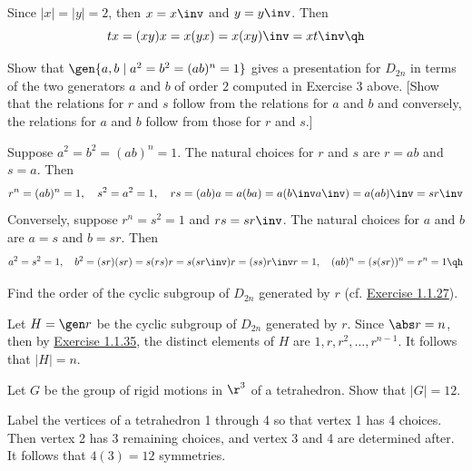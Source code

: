 \begin{sol}
    Since $|x| = |y| = 2$, then $x = x\inv$ and $y = y\inv$. Then
    \[tx = (xy)x = x(yx) = x(xy)\inv = x t\inv \qh\]
\end{sol}

\begin{exercise}\label{ex1.2.7}
    Show that $\gen{a, b \mid a^2 = b^2 = (ab)^n = 1}$ gives a presentation for $D_{2n}$ in terms of the two generators $a$ and $b$ of order $2$ computed in Exercise 3 above. [Show that the relations for $r$ and $s$ follow from the relations for $a$ and $b$ and conversely, the relations for $a$ and $b$ follow from those for $r$ and $s$.]
\end{exercise}

\begin{sol}
    Suppose $a^2 = b^2 = (ab)^n = 1$. The natural choices for $r$ and $s$ are $r = ab$ and $s = a$. Then
    \[r^n = (ab)^n = 1, \quad s^2 = a^2 = 1, \quad rs = (ab)a = a(ba) = a(b\inv a\inv) = a(ab)\inv = sr\inv \]
    Conversely, suppose $r^n = s^2 = 1$ and $rs = sr\inv$. The natural choices for $a$ and $b$ are $a = s$ and $b = sr$. Then
    \[a^2 = s^2 = 1, \quad b^2 = (sr)(sr) = s(r s)r = s(sr\inv)r = (s s) r\inv r = 1, \quad (ab)^n = (s(sr))^n = r^n = 1 \qh\]
\end{sol}

\begin{exercise}\label{ex1.2.8}
    Find the order of the cyclic subgroup of $D_{2n}$ generated by $r$ (cf. \hyperref[ex1.1.27]{Exercise 1.1.27}).
\end{exercise}

\begin{sol}
    Let $H = \gen r$ be the cyclic subgroup of $D_{2n}$ generated by $r$. Since $\abs r = n$, then by \hyperref[ex1.1.35]{Exercise 1.1.35}, the distinct elements of $H$ are $1, r, r^2, \dots, r^{n-1}$. It follows that $|H| = n$.
\end{sol}

\begin{exercise} \label{ex1.2.9} 
    Let $G$ be the group of rigid motions in $\r^3$ of a tetrahedron. Show that $|G| = 12$.
\end{exercise}

\begin{sol}
    Label the vertices of a tetrahedron 1 through 4 so that vertex 1 has 4 choices. Then vertex 2 has 3 remaining choices, and vertex 3 and 4 are determined after. It follows that $4(3) = 12$ symmetries.
\end{sol}

